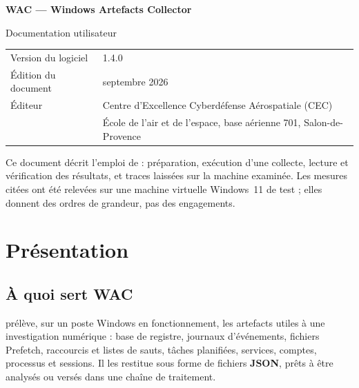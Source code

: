 \documentclass[11pt,a4paper,oneside]{report}
\begin{document}

\thispagestyle{empty}
\vspace*{\fill}
{\color{marine}\Large\bfseries WAC — Windows Artefacts Collector}\par
{\color{bleu}Documentation utilisateur}\par
\medskip
\begin{tabular}{@{}ll@{}}
Version du logiciel & 1.4.0 \\
Édition du document & septembre 2026 \\
Éditeur & Centre d'Excellence Cyberdéfense Aérospatiale (CEC) \\
        & École de l'air et de l'espace, base aérienne 701, Salon-de-Provence \\
\end{tabular}

\bigskip
{\small\color{gris}Ce document décrit l'emploi de \wac{} : préparation, exécution
d'une collecte, lecture et vérification des résultats, et traces laissées sur la
machine examinée. Les mesures citées ont été relevées sur une machine virtuelle
Windows~11 de test ; elles donnent des ordres de grandeur, pas des
engagements.}
\vspace*{2cm}
\clearpage

\tableofcontents

\chapter{Présentation}

\section{À quoi sert WAC}

\wac{} prélève, sur un poste Windows en fonctionnement, les artefacts utiles à
une investigation numérique : base de registre, journaux d'événements, fichiers
Prefetch, raccourcis et listes de sauts, tâches planifiées, services, comptes,
processus et sessions. Il les restitue sous forme de fichiers \textbf{JSON},
prêts à être analysés ou versés dans une chaîne de traitement.
\end{document}
